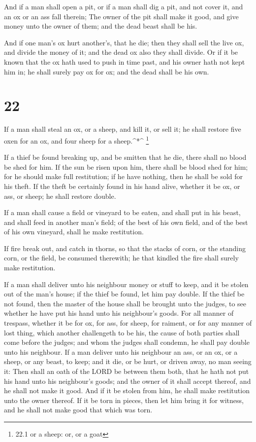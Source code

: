  And if a man shall open a pit, or if a man shall dig a
pit, and not cover it, and an ox or an ass fall therein; 
The owner of the pit shall make it good, and give money unto the owner
of them; and the dead beast shall be his.

 And if one man's ox hurt another's, that he die; then they
shall sell the live ox, and divide the money of it; and the dead ox also
they shall divide.  Or if it be known that the ox hath used
to push in time past, and his owner hath not kept him in; he shall
surely pay ox for ox; and the dead shall be his own.

\hypertarget{section-21}{%
\section{22}\label{section-21}}

 If a man shall steal an ox, or a sheep, and kill it, or
sell it; he shall restore five oxen for an ox, and four sheep for a
sheep.\^{}*\^{} \footnote{22.1 or a sheep: or, or a goat}

 If a thief be found breaking up, and be smitten that he
die, there shall no blood be shed for him.  If the sun be
risen upon him, there shall be blood shed for him; for he should make
full restitution; if he have nothing, then he shall be sold for his
theft.  If the theft be certainly found in his hand alive,
whether it be ox, or ass, or sheep; he shall restore double.

 If a man shall cause a field or vineyard to be eaten, and
shall put in his beast, and shall feed in another man's field; of the
best of his own field, and of the best of his own vineyard, shall he
make restitution.

 If fire break out, and catch in thorns, so that the stacks
of corn, or the standing corn, or the field, be consumed therewith; he
that kindled the fire shall surely make restitution.

 If a man shall deliver unto his neighbour money or stuff to
keep, and it be stolen out of the man's house; if the thief be found,
let him pay double.  If the thief be not found, then the
master of the house shall be brought unto the judges, to see whether he
have put his hand unto his neighbour's goods.  For all
manner of trespass, whether it be for ox, for ass, for sheep, for
raiment, or for any manner of lost thing, which another challengeth to
be his, the cause of both parties shall come before the judges; and whom
the judges shall condemn, he shall pay double unto his neighbour.
 If a man deliver unto his neighbour an ass, or an ox, or a
sheep, or any beast, to keep; and it die, or be hurt, or driven away, no
man seeing it:  Then shall an oath of the LORD be between
them both, that he hath not put his hand unto his neighbour's goods; and
the owner of it shall accept thereof, and he shall not make it good.
 And if it be stolen from him, he shall make restitution
unto the owner thereof.  If it be torn in pieces, then let
him bring it for witness, and he shall not make good that which was
torn.

